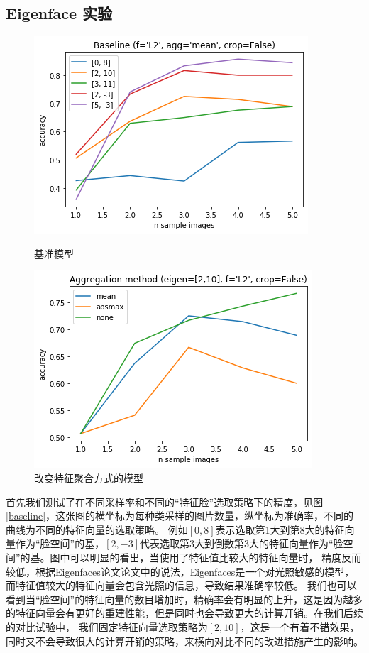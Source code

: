 \documentclass{ctexart}
\begin{document}
    \subsection{Eigenface 实验}
    
    \begin{figure}[htbp]
        \begin{minipage}[t]{0.45 \linewidth}
            \centering
            \includegraphics[scale=0.45]{imgs/baseline.png}
            \caption{基准模型}
            \label{baseline}
        \end{minipage}
        \begin{minipage}[t]{0.45 \linewidth}
            \centering
            \includegraphics[scale=0.45]{imgs/agg.png}
            \caption{改变特征聚合方式的模型}
            \label{agg}
        \end{minipage}
    \end{figure}
    首先我们测试了在不同采样率和不同的“特征脸”选取策略下的精度，见图\ref{baseline}，这张图的横坐标为每种类采样的图片数量，纵坐标为准确率，不同的曲线为不同的特征向量的选取策略。
    例如$[0,8]$表示选取第1大到第8大的特征向量作为“脸空间”的基，$[2,-3]$代表选取第3大到倒数第3大的特征向量作为“脸空间”的基。图中可以明显的看出，当使用了特征值比较大的特征向量时，
    精度反而较低，根据Eigenfaces论文\cite{doi:10.1162/jocn.1991.3.1.71}论文中的说法，Eigenfaces是一个对光照敏感的模型，而特征值较大的特征向量会包含光照的信息，导致结果准确率较低。
    我们也可以看到当“脸空间”的特征向量的数目增加时，精确率会有明显的上升，这是因为越多的特征向量会有更好的重建性能，但是同时也会导致更大的计算开销。在我们后续的对比试验中，
    我们固定特征向量选取策略为$[2,10]$，这是一个有着不错效果，同时又不会导致很大的计算开销的策略，来横向对比不同的改进措施产生的影响。
    
\end{document}
